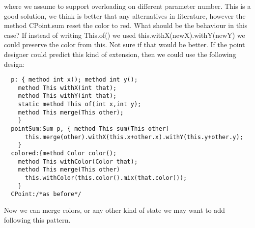 \documentclass{llncs}
\begin{document}
where we assume to support overloading on different parameter number.
This is a good solution, we think is better that any alternatives in literature,
however the method CPoint.sum reset the color to red.
What should be the behaviour in this case?
If instead of writing This.of() we used 
this.withX(newX).withY(newY) we could preserve the color from this.
Not sure if that would be better.
If the point designer could predict this kind of extension, then we could
use the following design:  
\begin{lstlisting}
  p: { method int x(); method int y();
    method This withX(int that);
    method This withY(int that);
    static method This of(int x,int y);
    method This merge(This other);
    }
  pointSum:Sum p, { method This sum(This other)
      this.merge(other).withX(this.x+other.x).withY(this.y+other.y);
    }
  colored:{method Color color();
    method This withColor(Color that);
    method This merge(This other)
      this.withColor(this.color().mix(that.color());
    }
  CPoint:/*as before*/
\end{lstlisting}  
  Now we can merge colors, or any other kind of state we may want to add
  following this pattern.
\end{document}
